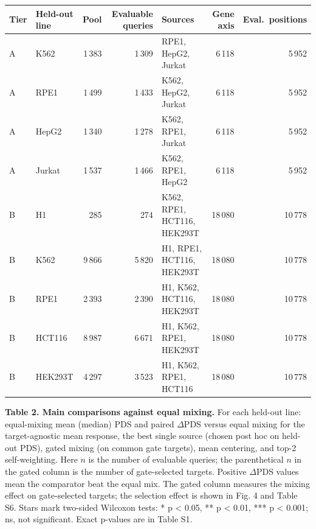 \documentclass[12pt]{article}
\begin{document}
\begin{singlespace}
\vspace{6pt}
{\footnotesize
\setlength{\tabcolsep}{4pt}
\renewcommand{\arraystretch}{1.0}
\begin{tabular}{@{}llrrp{2.1in}rr@{}}
\toprule
Tier & Held-out line & Pool & Evaluable queries & Sources & Gene axis & Eval.\ positions \\
\midrule
A & K562 & 1\,383 & 1\,309 & RPE1, HepG2, Jurkat & 6\,118 & 5\,952 \\
A & RPE1 & 1\,499 & 1\,433 & K562, HepG2, Jurkat & 6\,118 & 5\,952 \\
A & HepG2 & 1\,340 & 1\,278 & K562, RPE1, Jurkat & 6\,118 & 5\,952 \\
A & Jurkat & 1\,537 & 1\,466 & K562, RPE1, HepG2 & 6\,118 & 5\,952 \\
\midrule
B & H1 & 285 & 274 & K562, RPE1, HCT116, HEK293T & 18\,080 & 10\,778 \\
B & K562 & 9\,866 & 5\,820 & H1, RPE1, HCT116, HEK293T & 18\,080 & 10\,778 \\
B & RPE1 & 2\,393 & 2\,390 & H1, K562, HCT116, HEK293T & 18\,080 & 10\,778 \\
B & HCT116 & 8\,987 & 6\,671 & H1, K562, RPE1, HEK293T & 18\,080 & 10\,778 \\
B & HEK293T & 4\,297 & 3\,523 & H1, K562, RPE1, HCT116 & 18\,080 & 10\,778 \\
\bottomrule
\end{tabular}
}

\clearpage

\noindent\textbf{Table 2. Main comparisons against equal mixing.} For each held-out line: equal-mixing mean (median) PDS and paired $\Delta$PDS versus equal mixing for the target-agnostic mean response, the best single source (chosen post hoc on held-out PDS), gated mixing (on common gate targets), mean centering, and top-2 self-weighting. Here $n$ is the number of evaluable queries; the parenthetical $n$ in the gated column is the number of gate-selected targets. Positive $\Delta$PDS values mean the comparator beat the equal mix. The gated column measures the mixing effect on gate-selected targets; the selection effect is shown in Fig. 4 and Table S6. Stars mark two-sided Wilcoxon tests: * p < 0.05, ** p < 0.01, *** p < 0.001; ns, not significant. Exact p-values are in Table S1.


\end{singlespace}
\end{document}

